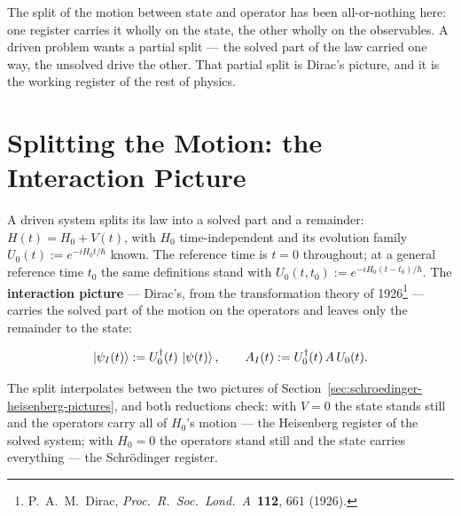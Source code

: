 The split of the motion between state and operator has been all-or-nothing here: one register carries it wholly on the state, the other wholly on the observables. A driven problem wants a partial split --- the solved part of the law carried one way, the unsolved drive the other. That partial split is Dirac's picture, and it is the working register of the rest of physics.

\section{Splitting the Motion: the Interaction Picture}
\label{sec:interaction-picture}

A driven system splits its law into a solved part and a remainder: $H(t) = H_0 + V(t)$, with $H_0$ time-independent and its evolution family $U_0(t) := e^{-iH_0t/\hbar}$ known. The reference time is $t = 0$ throughout; at a general reference time $t_0$ the same definitions stand with $U_0(t, t_0) := e^{-iH_0(t-t_0)/\hbar}$. The \textbf{interaction picture} --- Dirac's, from the transformation theory of 1926\footnote{P.~A.~M.~Dirac, \emph{Proc.~R.~Soc.~Lond.~A}~\textbf{112}, 661 (1926).} --- carries the solved part of the motion on the operators and leaves only the remainder to the state:
\begin{linenomath}
    \begin{equation}
        \ket{\psi_I(t)} := U_0^\dagger(t)\,\ket{\psi(t)}, \qquad A_I(t) := U_0^\dagger(t)\,A\,U_0(t) .
        \label{eq:interaction-state}
    \end{equation}
\end{linenomath}
The split interpolates between the two pictures of Section~\ref{sec:schroedinger-heisenberg-pictures}, and both reductions check: with $V = 0$ the state stands still and the operators carry all of $H_0$'s motion --- the Heisenberg register of the solved system; with $H_0 = 0$ the operators stand still and the state carries everything --- the Schr\"odinger register.

